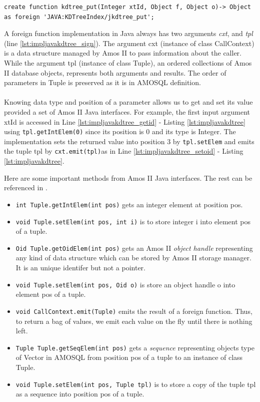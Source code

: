\documentclass[12pt]{article}
\begin{document}
\begin{lstlisting}[caption={Definition of foreign function kdtree\_put in AMOSQL},label={lst:defamosqlkdput}]
 create function kdtree_put(Integer xtId, Object f, Object o)-> Object as foreign 'JAVA:KDTreeIndex/jkdtree_put';
\end{lstlisting}
A foreign function implementation in Java always has two arguments \emph{cxt}, and \emph{tpl} (line \ref{lst:impljavakdtree_sign}). The argument cxt (instance of class CallContext) is a data structure managed by Amos II to pass information about the caller. While the argument tpl (instance of class Tuple), an ordered collections of Amos II database objects, represents both arguments and results. The order of parameters in Tuple is preserved as it is in AMOSQL definition.\\\\
Knowing data type and position of a parameter allows us to get and set its value provided a set of Amos II Java interfaces. For example, the first input argument xtId  is accessed in Line \ref{lst:impljavakdtree_getid} - Listing \ref{lst:impljavakdtree} using \texttt{tpl.getIntElem(0)} since its position is 0 and its type is Integer. The implementation sets the returned value into position 3 by \texttt{tpl.setElem} and emits the tuple tpl by \texttt{cxt.emit(tpl)}as in Line \ref{lst:impljavakdtree_setoid} - Listing \ref{lst:impljavakdtree}.

Here are some important methods from Amos II Java interfaces. The rest can be referenced in \cite{AmosIIJava}.
\begin{itemize}
\item \texttt{int Tuple.getIntElem(int pos)} gets an integer element at position pos.
\item \texttt{void Tuple.setElem(int pos, int i)} is to store integer i into element pos of a tuple.
\item \texttt{Oid Tuple.getOidElem(int pos)} gets an Amos II \emph{object handle} representing any kind of data structure which can be stored by Amos II storage manager. It is an unique identifer but not a pointer.
\item \texttt{void Tuple.setElem(int pos, Oid o)} is store an object handle o into element pos of a tuple.
\item \texttt{void CallContext.emit(Tuple)} emits the result of a foreign function. Thus, to return a bag of values, we emit each value on the fly until there is nothing left.
\item \texttt{Tuple Tuple.getSeqElem(int pos)} gets a \emph{sequence} representing objects type of Vector in AMOSQL from position pos of a tuple to an instance of class Tuple.
\item \texttt{void Tuple.setElem(int pos, Tuple tpl)} is to store a copy of the tuple tpl as a sequence into position pos of a tuple.
\end{itemize}
\end{document}

